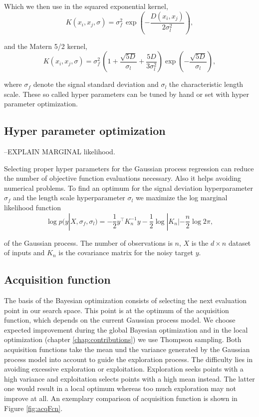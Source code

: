 Which we then use in the squared exponential kernel,
$$K(x_i,x_j,\sigma) = \sigma_{f}^{2}\,\exp\left(-\frac{D(x_i,x_j)}{2\sigma_l^2} \right), $$

and the Matern 5/2 kernel,
$$K(x_i,x_j,\sigma) = \sigma_{f}^{2}\,\left(1 + \frac{\sqrt{5 D}}{\sigma_l} + \frac{5 D}{3\sigma_l^2} \right) \exp\left(-\frac{\sqrt{5 D}}{\sigma_l} \right),$$

where $\sigma_f$ denote the signal standard deviation and $\sigma_l$ the characteristic length scale. These so called hyper parameters can be tuned by hand or set with hyper parameter optimization.

\subsection{Hyper parameter optimization}

--EXPLAIN MARGINAL likelihood.

Selecting proper hyper parameters for the Gaussian process regression can reduce the number of objective function evaluations necessary. Also it helps avoiding numerical problems. To find an optimum for the signal deviation hyperparameter $\sigma_f$ and the length scale hyperparameter $\sigma_l$ we maximize the log marginal likelihood function
\begin{equation} \label{eq:hypOpt}
    \log p(y|X,\sigma_f,\sigma_l) = -\frac{1}{2} y^\top K_n^{-1} y -\frac{1}{2} \log |K_n| -\frac{n}{2}\log 2\pi,
\end{equation}

of the Gaussian process. The number of observations is $n$, $X$ is the $d \times n$ dataset of inputs and $K_n$ is the covariance matrix for the noisy target $y$.

\subsection{Acquisition function}
The basis of the Bayesian optimization consists of selecting the next evaluation point in our search space. This point is at the optimum of the acquisition function, which depends on the current Gaussian process model. We choose expected improvement during the global Bayesian optimization and in the local optimization (chapter \ref{chap:contributions}) we use Thompson sampling. Both acquisition functions take the mean und the variance generated by the Gaussian process model into account to guide the exploration process. The difficulty lies in avoiding excessive exploration or exploitation. Exploration seeks points with a high variance and exploitation selects points with a high mean instead. The latter one would result in a local optimum whereas too much exploration may not improve at all. An exemplary comparison of acquisition function is shown in Figure \ref{fig:acqFcn}.

